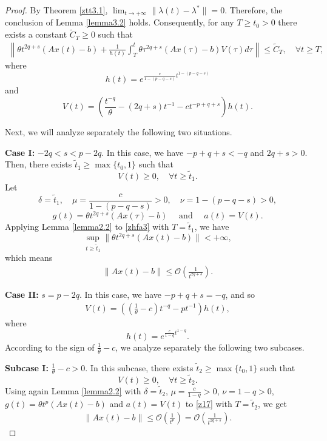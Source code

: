 \documentclass[review]{elsarticle}
\begin{document}
   \begin{proof}

By  Theorem \ref{ztt3.1}, $\lim_{t\rightarrow+\infty}\|\lambda(t)-\lambda^*\|=0$. Therefore, the conclusion of Lemma  \ref{lemma3.2} holds. Consequently,  for any $T\geq t_0>0$ there exists a constant $\widetilde{C}_{T}\geq0$ such that
		\begin{eqnarray}\label{zhfa3}
			\left\|\theta t^{2q+s}(Ax(t)-b)+\frac{1}{h(t)}\int_{T}^{t}\theta \tau^{2q+s}(Ax(\tau)-b)V(\tau)d\tau\right\|\leq\widetilde{C}_{T}, \quad \forall t\geq T,
		\end{eqnarray}	
		where 
$$h(t)=e^{\frac{c}{1-(p-q-s)}t^{1-(p-q-s)}}$$
and $$V(t)=\left(\frac{t^{-q}}{\theta}-(2q+s)t^{-1}-ct^{-p+q+s}\right)h(t).$$ 

	
Next, we will analyze separately the following two situations.
	
	{\bf Case I:} $-2q<s<p-2q$. In this case, we have $-p+q+s<-q$ and $2q+s>0$.  Then, there exists $\tilde{t}_1\geq \max\{t_0,1\}$ such that 
	$$V(t)\geq0, \quad \forall t\geq\tilde{t}_1.$$
Let
 $$\delta=\tilde{t}_1,\quad \mu=\frac{c}{1-(p-q-s)}>0,\quad \nu=1-(p-q-s)>0,$$
$$g(t)=\theta t^{2q+s}(Ax(\tau)-b)\quad\text{ and }\quad a(t)=V(t).$$
Applying Lemma \ref{lemma2.2} to \eqref{zhfa3} with  $T=\tilde{t}_1$,
	we have
	$$\sup_{t\geq \tilde{t}_1}\|\theta t^{2q+s}(Ax(t)-b)\|<+\infty,$$
	which means 
	\begin{eqnarray*}
		\|Ax(t)-b\|\leq\mathcal{O}\left(\frac{1}{t^{2q+s}}\right).
	\end{eqnarray*}	
	 
	{\bf Case II:} $s=p-2q$. In this case, we have $-p+q+s=-q$, and so
	\begin{eqnarray}\label{z17}
		V(t)=\left(\left(\frac{1}{\theta}-c\right)t^{-q}-pt^{-1}\right)h(t),
	\end{eqnarray}	
	where 
$$h(t)=e^{\frac{c}{1-q}t^{1-q}}.$$
According to the sign of $\frac{1}{\theta}-c$, we analyze separately the following two subcases.
	
	{\bf Subcase I:} $\frac{1}{\theta}-c>0$. In this subcase, there exists $\tilde{t}_2\geq \max\{t_0,1\}$ such that 
	$$V(t)\geq0, \quad \forall t\geq \tilde{t}_2.$$ 
	Using again Lemma \ref{lemma2.2} with $\delta=\tilde{t}_2$, $\mu=\frac{c}{1-q}>0$, $\nu=1-q>0$, $g(t)=\theta t^{p}(Ax(t)-b)$ and $a(t)=V(t)$  to \eqref{z17} with  $T=\tilde{t}_2$,
	we get 
	\begin{eqnarray}\label{z18}
		\|Ax(t)-b\|\leq\mathcal{O}\left(\frac{1}{t^{p}}\right)=\mathcal{O}\left(\frac{1}{t^{2q+s}}\right).
	\end{eqnarray}	
	

\end{proof}
\end{document}
